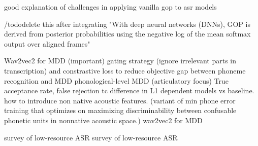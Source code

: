 \documentclass[thesis]{cluu}
\begin{document}
\parencite{caoSegmentationfreeGoodnessPronunciation2025} good explanation of challenges in applying vanilla gop to asr models

/todo{delete this after integrating}
"With deep neural networks (DNNs), GOP is derived from posterior probabilities using the negative log of the mean softmax output over aligned frames" \parencite{parikhEvaluatingLogitBasedGOP2025}

\textcite{pengStudyFineTuningWav2vec202021} Wav2vec2 for MDD (important)
\textcite{pengTextAwareEndtoendMispronunciation2022} gating strategy (ignore irrelevant parts in transcription) and constrastive loss to reduce objective gap between phoneme recognition and MDD
\textcite{shahinPhonologicalLevelMispronunciationDetection2024} phonological-level MDD (articulatory focus) True acceptance rate, false rejection tc
\textcite{stanleyImprovingL1specificPhonological2012} difference in L1 dependent models vs baseline. how to introduce non native acoustic features. (variant of min phone error training that optimizes on maximizing discriminability between confusable phonetic units in nonnative acoustic space.)
\textcite{xuExploreWav2vec202021} wav2vec2 for MDD

\parencite{barteldsMakingMoreLittle2023} survey of low-resource ASR
\parencite{besacierAutomaticSpeechRecognition2014} survey of low-resource ASR
\end{document}
